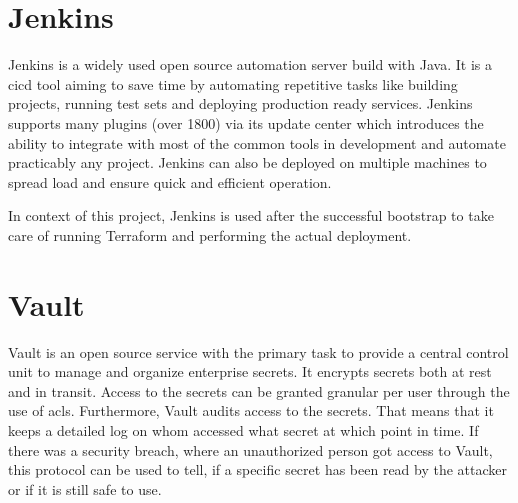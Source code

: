 \section{Jenkins}
Jenkins is a widely used open source automation server build with Java.
It is a \ac{cicd} tool aiming to save time by automating repetitive tasks like building projects, running test sets and deploying production ready services.
Jenkins supports many plugins (over 1800) via its update center which introduces the ability to integrate with most of the common tools in development and automate practicably any project.
Jenkins can also be deployed on multiple machines to spread load and ensure quick and efficient operation.
\cite{jenkins.io, jenkins.github, gitlab.cicd}

In context of this project, Jenkins is used after the successful bootstrap to take care of running Terraform and performing the actual deployment.

    

\section{Vault}
\label{sec:vault}
Vault is an open source service with the primary task to provide a central control unit to manage and organize enterprise secrets.
It encrypts secrets both at rest and in transit.
Access to the secrets can be granted granular per user through the use of \acp{acl}.
Furthermore, Vault audits access to the secrets.
That means that it keeps a detailed log on whom accessed what secret at which point in time.
If there was a security breach, where an unauthorized person got access to Vault, this protocol can be used to tell, if a specific secret has been read by the attacker or if it is still safe to use.

